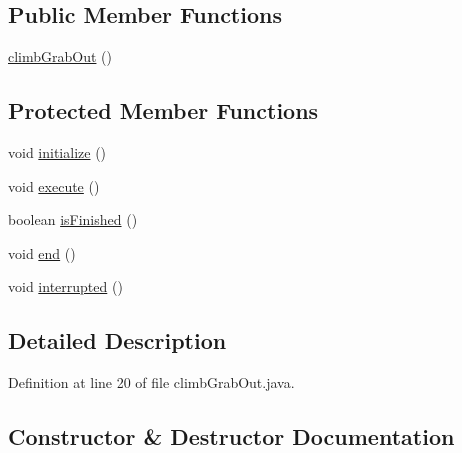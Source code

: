 \subsection*{Public Member Functions}
\begin{DoxyCompactItemize}
\item 
\mbox{\hyperlink{classorg_1_1usfirst_1_1frc3707_1_1_creedence_1_1commands_1_1climb_grab_out_ae261613df834bb64b4e39bc34d076fcd}{climb\+Grab\+Out}} ()
\end{DoxyCompactItemize}
\subsection*{Protected Member Functions}
\begin{DoxyCompactItemize}
\item 
void \mbox{\hyperlink{classorg_1_1usfirst_1_1frc3707_1_1_creedence_1_1commands_1_1climb_grab_out_a102e6c8dee9668acbf94237c0f0976a1}{initialize}} ()
\item 
void \mbox{\hyperlink{classorg_1_1usfirst_1_1frc3707_1_1_creedence_1_1commands_1_1climb_grab_out_a5d78dc82443116365fc0c84a04d07016}{execute}} ()
\item 
boolean \mbox{\hyperlink{classorg_1_1usfirst_1_1frc3707_1_1_creedence_1_1commands_1_1climb_grab_out_aa502e52e3aa63d724837acdb34ce605e}{is\+Finished}} ()
\item 
void \mbox{\hyperlink{classorg_1_1usfirst_1_1frc3707_1_1_creedence_1_1commands_1_1climb_grab_out_a669fbe0e144edd645b91c56a2712358e}{end}} ()
\item 
void \mbox{\hyperlink{classorg_1_1usfirst_1_1frc3707_1_1_creedence_1_1commands_1_1climb_grab_out_a2ba9a87d25788d2c60efcf9eaeb37db4}{interrupted}} ()
\end{DoxyCompactItemize}


\subsection{Detailed Description}


Definition at line 20 of file climb\+Grab\+Out.\+java.



\subsection{Constructor \& Destructor Documentation}
\mbox{\label{classorg_1_1usfirst_1_1frc3707_1_1_creedence_1_1commands_1_1climb_grab_out_ae261613df834bb64b4e39bc34d076fcd}} 
